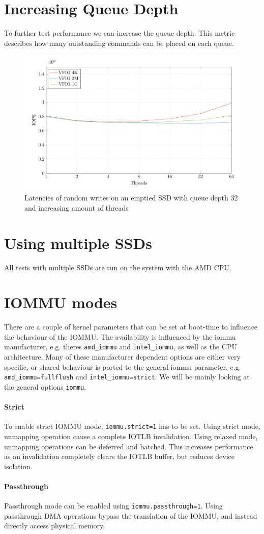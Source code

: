 \section{Increasing Queue Depth}
To further test performance we can increase the queue depth. This metric describes how many outstanding commands can be placed on each queue.

\begin{figure}
    \centering
    \includegraphics[width=\textwidth]{figures/qd32tn-65536pg}
    \caption{Latencies of random writes on an emptied SSD with queue depth 32 and increasing amount of threads}
    \label{fig:qd32tn}
\end{figure}


\section{Using multiple SSDs}
All tests with multiple SSDs are run on the system with the AMD CPU.

\section{IOMMU modes}
There are a couple of kernel parameters that can be set at boot-time to influence the behaviour of the IOMMU. The availability is influenced by the iommu manufacturer, e.g. theres \texttt{amd\_iommu} and \texttt{intel\_iommu}, as well as the CPU architecture. Many of these manufacturer dependent options are either very specific, or shared behaviour is ported to the general iommu parameter, e.g. \texttt{amd\_iommu=fullflush} and \texttt{intel\_iommu=strict}. We will be mainly looking at the general options \texttt{iommu}.

\paragraph{Strict}
To enable strict IOMMU mode, \texttt{iommu.strict=1} has to be set. Using strict mode, unmapping operation cause a complete IOTLB invalidation. Using relaxed mode, unmapping operations can be deferred and batched. This increases performance as an invalidation completely clears the IOTLB buffer, but reduces device isolation.

\paragraph{Passthrough}
Passthrough mode can be enabled using \texttt{iommu.passthrough=1}. Using passthrough DMA operations bypass the translation of the IOMMU, and instead directly access physical memory.